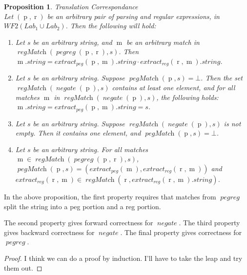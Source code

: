 \documentclass[11pt]{article}
\newcommand{\synPeg}{\ensuremath{\operatorname{p}}}
\newcommand{\synReg}{\ensuremath{\operatorname{r}}}
\newcommand{\metaMatch}{\ensuremath{\operatorname{m}}}
\newcommand{\setWFTwo}{\mathit{WF2}}
\newcommand{\setLab}{\mathit{Lab}}
\newcommand{\funPEGREG}{\operatorname{\mathit{pegreg}}}
\newcommand{\funPegMatch}{\operatorname{\mathit{pegMatch}}}
\newcommand{\funRegMatch}{\operatorname{\mathit{regMatch}}}
\newcommand{\funNegate}{\operatorname{\mathit{negate}}}
\newcommand{\funExtractPeg}{\operatorname{\mathit{extract_{peg}}}}
\newcommand{\funExtractReg}{\operatorname{\mathit{extract_{reg}}}}
\newtheorem{proposition}{Proposition}
\begin{document}
\begin{proposition} Translation Correspondance \\
  Let $(\synPeg, \synReg)$ be an arbitrary pair of parsing and regular expressions, in
  $\setWFTwo(\setLab_1 \cup \setLab_2)$. Then the following will hold:

  \begin{enumerate}
  \item Let $s$ be an arbitrary string, and $\metaMatch$ be an arbitrary match in
    $\funRegMatch(\funPEGREG(\synPeg, \synReg), s)$. Then
    $\metaMatch.\mathit{string} = \funExtractPeg(\synPeg, \metaMatch).string \cdot \funExtractReg(\synReg, \metaMatch).string$.

  \item Let $s$ be an arbitrary string. Suppose $\funPegMatch(\synPeg, s) = \bot$.
    Then the set $\funRegMatch(\funNegate(\synPeg), s)$ contains at least one element, and
    for all matches $\metaMatch$ in $\funRegMatch(\funNegate(\synPeg), s)$, the following
    holds: $\metaMatch.{\mathit{string}} = \funExtractPeg(\synPeg, \metaMatch).{\mathit{string}} = s$.

  \item Let $s$ be an arbitrary string. Suppose $\funRegMatch(\funNegate(\synPeg), s)$ is
    not empty. Then it contains one element, and $\funPegMatch(\synPeg, s) = \bot$.

  \item Let $s$ be an arbitrary string. For all matches
    $\metaMatch \in \funRegMatch(\funPEGREG(\synPeg, \synReg), s)$,
    $\funPegMatch(\synPeg, s) = (\funExtractPeg(\metaMatch), \funExtractReg(\synReg, \metaMatch))$ and
    $\funExtractReg(\synReg, \metaMatch) \in \funRegMatch(\synReg, \funExtractReg(\synReg, \metaMatch).\mathit{string})$.
  \end{enumerate}
\end{proposition}

In the above proposition, the first property requires that matches
from $\funPEGREG$ split the string into a peg portion and a reg portion.

The second property gives forward correctness for $\funNegate$. The third property
gives backward correctness for $\funNegate$. The final property gives correctness for
$\funPEGREG$.

\begin{proof}
  I think we can do a proof by induction. I'll have to take the leap
  and try them out.
\end{proof}
\end{document}

